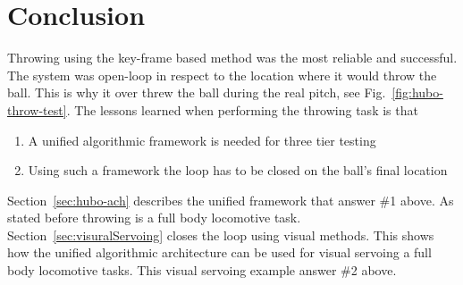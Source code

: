 \section{Conclusion}\label{sec:throw:conclusion}
	Throwing using the key-frame based method was the most reliable and successful.  
	The system was open-loop in respect to the location where it would throw the ball.
	This is why it over threw the ball during the real pitch, see Fig.~\ref{fig:hubo-throw-test}.
	The lessons learned when performing the throwing task is that
	\begin{enumerate}
		\item A unified algorithmic framework is needed for three tier testing
		\item Using such a framework the loop has to be closed on the ball's final location
	\end{enumerate}

	Section~\ref{sec:hubo-ach} describes the unified framework that answer \#1 above.
	As stated before throwing is a full body locomotive task. 
	Section~\ref{sec:visuralServoing} closes the loop using visual methods.
	This shows how the unified algorithmic architecture can be used for visual servoing a full body locomotive tasks.
	This visual servoing example answer \#2 above.



		
